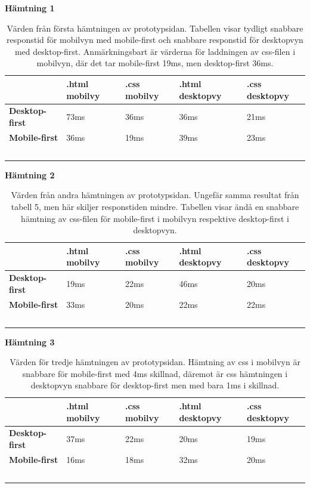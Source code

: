 \documentclass[11pt]{article}
\begin{document}
\newpage
\textbf{Hämtning 1}

\begin{table}[H]
	\centering
	\begin{tabular}{|p{2.5cm}|p{2.7cm}|p{2.4cm}|p{3.1cm}|p{2.8cm}|}
	\hline
	~&\textbf{.html mobilvy}&\textbf{.css mobilvy}&\textbf{.html desktopvy}&\textbf{.css desktopvy}\\ \hline
	\textbf{Desktop-first}&73ms&36ms&36ms&21ms\\ \hline
	\textbf{Mobile-first}&36ms&19ms&39ms&23ms \\ \hline
	~&~&~ &~&~\\ \hline
	\end{tabular}
    \caption {Värden från första hämtningen av prototypsidan. Tabellen visar tydligt snabbare responstid för mobilvyn med mobile-first och snabbare responstid för desktopvyn med desktop-first. Anmärkningsbart är värderna för laddningen av css-filen i mobilvyn, där det tar mobile-first 19ms, men desktop-first 36ms.}
\end{table}

\textbf{Hämtning 2}

\begin{table}[H]
	\centering
	\begin{tabular}{|p{2.5cm}|p{2.7cm}|p{2.4cm}|p{3.1cm}|p{2.8cm}|}
	\hline
	~&\textbf{.html mobilvy}&\textbf{.css mobilvy}&\textbf{.html desktopvy}&\textbf{.css desktopvy}\\ \hline
	\textbf{Desktop-first}&19ms&22ms&46ms&20ms\\ \hline
	\textbf{Mobile-first}&33ms&20ms&22ms&22ms \\ \hline
	~&~&~ &~&~\\ \hline
	\end{tabular}
    \caption {Värden från andra hämtningen av prototypsidan. Ungefär samma resultat från tabell 5, men här skiljer responstiden mindre. Tabellen visar ändå en snabbare hämtning av css-filen för mobile-first i mobilvyn respektive desktop-first i desktopvyn.}
\end{table}

\textbf{Hämtning 3}

\begin{table}[H]
	\centering
	\begin{tabular}{|p{2.5cm}|p{2.7cm}|p{2.4cm}|p{3.1cm}|p{2.8cm}|}
	\hline
	~&\textbf{.html mobilvy}&\textbf{.css mobilvy}&\textbf{.html desktopvy}&\textbf{.css desktopvy}\\ \hline
	\textbf{Desktop-first}&37ms&22ms&20ms&19ms\\ \hline
	\textbf{Mobile-first}&16ms&18ms&32ms&20ms \\ \hline
	~&~&~ &~&~\\ \hline
	\end{tabular}
    \caption {Värden för tredje hämtningen av prototypsidan. Hämtning av css i mobilvyn är snabbare för mobile-first med 4ms skillnad, däremot är css hämtningen i desktopvyn snabbare för desktop-first men med bara 1ms i skillnad.}
\end{table}
\end{document}
